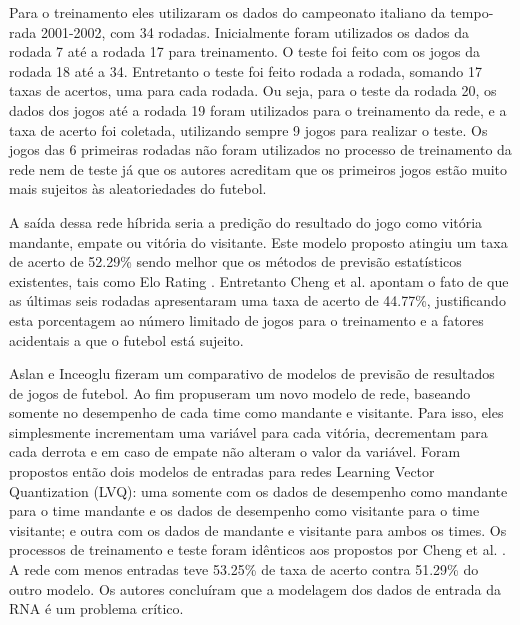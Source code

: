 \documentclass{article}
\begin{document}
Para o treinamento eles utilizaram os dados do campeonato italiano da tempo-
rada 2001-2002, com 34 rodadas. Inicialmente foram utilizados os dados da rodada 7
até a rodada 17 para treinamento. O teste foi feito com os jogos da rodada 18 até a 34. Entretanto o teste foi feito rodada a rodada, somando 17 taxas de acertos, uma para cada rodada. Ou seja, para o teste da rodada 20, os dados dos jogos até a rodada 19 foram utilizados para o treinamento da rede, e a taxa de acerto foi coletada, utilizando sempre
9 jogos para realizar o teste. Os jogos das 6 primeiras rodadas não foram utilizados no processo de treinamento da rede nem de teste já que os autores acreditam que os primeiros jogos estão muito mais sujeitos às aleatoriedades do futebol.

A saída dessa rede híbrida seria a predição do resultado do jogo como vitória
mandante, empate ou vitória do visitante. Este modelo proposto atingiu um taxa de
acerto de 52.29\% sendo melhor que os métodos de previsão estatísticos existentes, tais como Elo Rating \cite{Elo}. Entretanto Cheng et al. \cite{cheng2003new} apontam o fato de que as últimas seis rodadas apresentaram uma taxa de acerto de 44.77\%, justificando esta porcentagem ao número limitado de jogos para o treinamento e a fatores acidentais a que o futebol está sujeito.


Aslan e Inceoglu \cite{aslan2007comparative} fizeram um comparativo de modelos de previsão de resultados de jogos de futebol. Ao fim propuseram um novo modelo de rede, baseando somente no desempenho de cada time como mandante e visitante. Para isso, eles simplesmente incrementam uma variável para cada vitória, decrementam para cada derrota e em caso de empate não alteram o valor da variável. Foram propostos então dois modelos de entradas para redes Learning Vector Quantization (LVQ): uma somente com os dados de desempenho como mandante para o time mandante e os dados de desempenho como visitante para o time visitante; e outra com os dados de mandante e visitante para ambos os times. Os processos de treinamento e teste foram idênticos aos propostos por Cheng et al. \cite{cheng2003new}. A rede com menos entradas teve 53.25\% de taxa de acerto contra 51.29\% do outro modelo. Os autores concluíram que a modelagem dos dados de entrada da RNA é um problema crítico.
\end{document}

